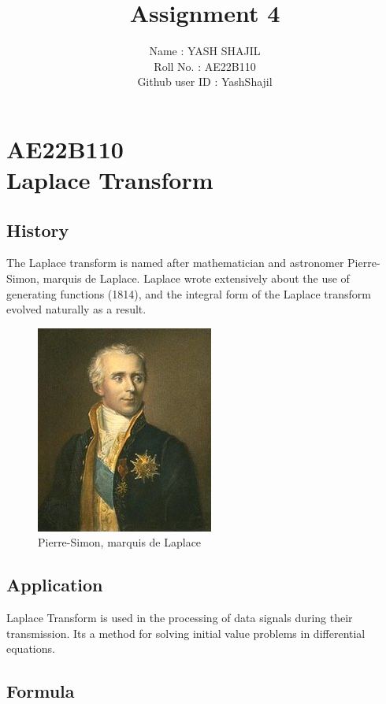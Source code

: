 \documentclass{article}
\title{Assignment 4}
\author{Name : YASH SHAJIL \\Roll No. : AE22B110 \\Github user ID : YashShajil}
\date{}
\begin{document}
\maketitle

\section*{AE22B110 \\ Laplace Transform}

\subsection*{History}

The Laplace transform is named after mathematician and astronomer Pierre-Simon, marquis de Laplace.
Laplace wrote extensively about the use of generating functions (1814), and the integral form of the Laplace transform evolved naturally as a result.

\begin{figure}[h]
    \centering
    \includegraphics[width = 0.4 \textwidth]{Laplace,_Pierre-Simon,_marquis_de.jpg}
    \caption{Pierre-Simon, marquis de Laplace}
    \label{Pierre-Simon, marquis de Laplace}
\end{figure}

\subsection*{Application}

Laplace Transform is used in the processing of data signals during their transmission. Its a method for solving initial value problems in differential equations. 

\subsection*{Formula}
\end{document}
